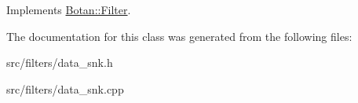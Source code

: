 Implements \hyperlink{classBotan_1_1Filter_ad856ce62d9bdcce8057da99cba606892}{Botan\-::\-Filter}.



The documentation for this class was generated from the following files\-:\begin{DoxyCompactItemize}
\item 
src/filters/data\-\_\-snk.\-h\item 
src/filters/data\-\_\-snk.\-cpp\end{DoxyCompactItemize}
